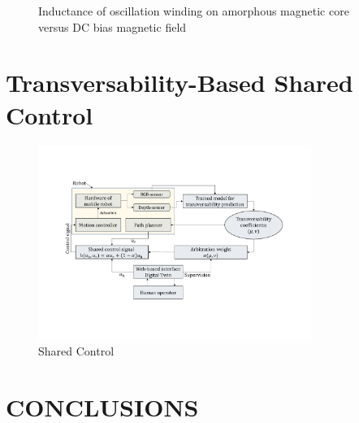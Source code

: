 \documentclass[letterpaper, 10 pt, conference]{ieeeconf}  %
\begin{document}



   \begin{figure}[thpb]
      \centering
      \caption{Inductance of oscillation winding on amorphous
       magnetic core versus DC bias magnetic field}
      \label{figurelabel}
   \end{figure}
   


\section{Transversability-Based Shared Control}
\begin{figure}[htbp]
	\centerline{\includegraphics[width=8.9cm]{images/transversability.pdf}}
	\caption{Shared Control}
	\label{fig:sharedcontrol}
\end{figure}
\section{CONCLUSIONS}


\addtolength{\textheight}{-12cm}   %
\end{document}
